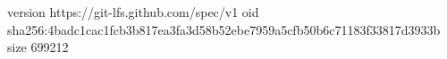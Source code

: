 version https://git-lfs.github.com/spec/v1
oid sha256:4badc1cac1fcb3b817ea3fa3d58b52ebe7959a5cfb50b6c71183f33817d3933b
size 699212
